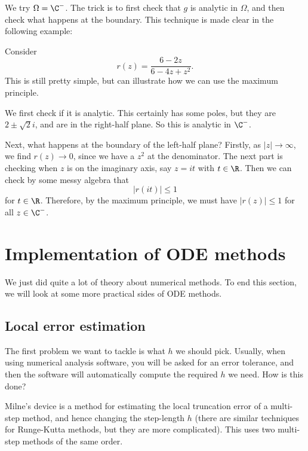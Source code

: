 \documentclass[a4paper]{article}
\begin{document}
We try $\Omega = \C^-$. The trick is to first check that $g$ is analytic in $\Omega$, and then check what happens at the boundary. This technique is made clear in the following example:

\begin{eg}
  Consider
  \[
    r(z) = \frac{6 - 2z}{6 - 4z + z^2}.
  \]
  This is still pretty simple, but can illustrate how we can use the maximum principle.

  We first check if it is analytic. This certainly has some poles, but they are $2 \pm \sqrt{2} i$, and are in the right-half plane. So this is analytic in $\C^-$.

  Next, what happens at the boundary of the left-half plane? Firstly, as $|z| \to \infty$, we find $r(z) \to 0$, since we have a $z^2$ at the denominator. The next part is checking when $z$ is on the imaginary axis, say $z = it$ with $t \in \R$. Then we can check by some messy algebra that
  \[
    |r(it)| \leq 1
  \]
  for $t \in \R$. Therefore, by the maximum principle, we must have $|r(z)| \leq 1$ for all $z \in \C^-$.
\end{eg}

\section{Implementation of ODE methods}
We just did quite a lot of theory about numerical methods. To end this section, we will look at some more practical sides of ODE methods.

\subsection{Local error estimation}
The first problem we want to tackle is what $h$ we should pick. Usually, when using numerical analysis software, you will be asked for an error tolerance, and then the software will automatically compute the required $h$ we need. How is this done?

Milne's device is a method for estimating the local truncation error of a multi-step method, and hence changing the step-length $h$ (there are similar techniques for Runge-Kutta methods, but they are more complicated). This uses two multi-step methods of the same order.
\end{document}
